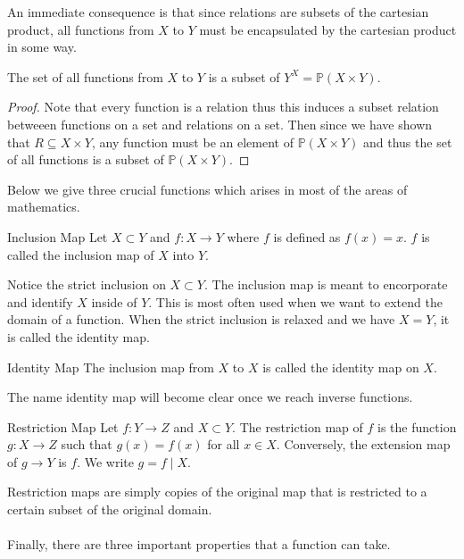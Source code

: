 \documentclass[a4paper]{article}
\begin{document}
An immediate consequence is that since relations are subsets of the cartesian product, all functions from $X$ to $Y$ must be encapsulated by the cartesian product in some way. 

\begin{prp}{}{} The set of all functions from $X$ to $Y$ is a subset of $Y^X=\mathbb{P}(X\times Y)$. \tcbline
\begin{proof}{}{} Note that every function is a relation thus this induces a subset relation betweeen functions on a set and relations on a set. Then since we have shown that $R\subseteq X\times Y$, any function must be an element of $\mathbb{P}(X\times Y)$ and thus the set of all functions is a subset of $\mathbb{P}(X\times Y)$. 
\end{proof}
\end{prp}

Below we give three crucial functions which arises in most of the areas of mathematics. 

\begin{defn}{Inclusion Map}{} Let $X\subset Y$ and $f:X\to Y$ where $f$ is defined as $f(x)=x$. $f$ is called the inclusion map of $X$ into $Y$. 
\end{defn}

Notice the strict inclusion on $X\subset Y$. The inclusion map is meant to encorporate and identify $X$ inside of $Y$. This is most often used when we want to extend the domain of a function. When the strict inclusion is relaxed and we have $X=Y$, it is called the identity map. 

\begin{defn}{Identity Map}{} The inclusion map from $X$ to $X$ is called the identity map on $X$. 
\end{defn}

The name identity map will become clear once we reach inverse functions. 

\begin{defn}{Restriction Map}{} Let $f:Y\to Z$ and $X\subset Y$. The restriction map of $f$ is the function $g:X\to Z$ such that $g(x)=f(x)$ for all $x\in X$. Conversely, the extension map of $g\to Y$ is $f$. We write $g=f\;|\;X$. 
\end{defn}

Restriction maps are simply copies of the original map that is restricted to a certain subset of the original domain. \\~\\

Finally, there are three important properties that a function can take. 
\end{document}
